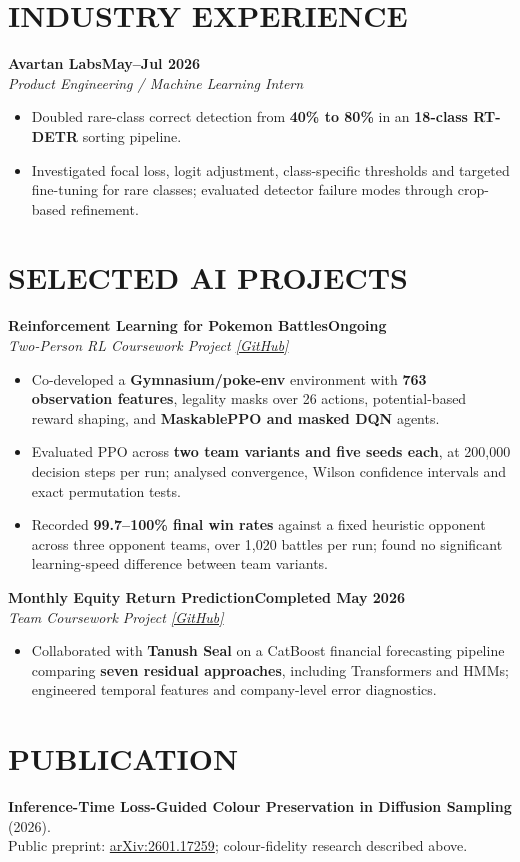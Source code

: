 \documentclass[10pt,a4paper]{article}
\newcommand{\entry}[3]{\noindent\textbf{#1}\hfill\textbf{#3}\\[-1pt]\textit{#2}\par}
\newenvironment{cvitems}{\begin{itemize}[leftmargin=1.1em,label=\textbullet,itemsep=2pt,topsep=3pt,parsep=0pt,partopsep=0pt]}{\end{itemize}}
\begin{document}
\section{INDUSTRY EXPERIENCE}
\entry{Avartan Labs}{Product Engineering / Machine Learning Intern}{May--Jul 2026}
\begin{cvitems}
  \item Doubled rare-class correct detection from \textbf{40\% to 80\%} in an \textbf{18-class RT-DETR} sorting pipeline.
  \item Investigated focal loss, logit adjustment, class-specific thresholds and targeted fine-tuning for rare classes; evaluated detector failure modes through crop-based refinement.
\end{cvitems}
\section{SELECTED AI PROJECTS}
\entry{Reinforcement Learning for Pokemon Battles}{Two-Person RL Coursework Project \href{https://github.com/Kabir1607/RL_MidSem_Kabir_Aarush}{[GitHub]}}{Ongoing}
\begin{cvitems}
  \item Co-developed a \textbf{Gymnasium/poke-env} environment with \textbf{763 observation features}, legality masks over 26 actions, potential-based reward shaping, and \textbf{MaskablePPO and masked DQN} agents.
  \item Evaluated PPO across \textbf{two team variants and five seeds each}, at 200,000 decision steps per run; analysed convergence, Wilson confidence intervals and exact permutation tests.
  \item Recorded \textbf{99.7--100\% final win rates} against a fixed heuristic opponent across three opponent teams, over 1,020 battles per run; found no significant learning-speed difference between team variants.
\end{cvitems}
\entry{Monthly Equity Return Prediction}{Team Coursework Project \href{https://github.com/MushuRam01/IML_project}{[GitHub]}}{Completed May 2026}
\begin{cvitems}
  \item Collaborated with \textbf{Tanush Seal} on a CatBoost financial forecasting pipeline comparing \textbf{seven residual approaches}, including Transformers and HMMs; engineered temporal features and company-level error diagnostics.
\end{cvitems}
\section{PUBLICATION}
\textbf{Inference-Time Loss-Guided Colour Preservation in Diffusion Sampling} (2026).\\
Public preprint: \href{https://arxiv.org/abs/2601.17259}{arXiv:2601.17259}; colour-fidelity research described above.
\end{document}
